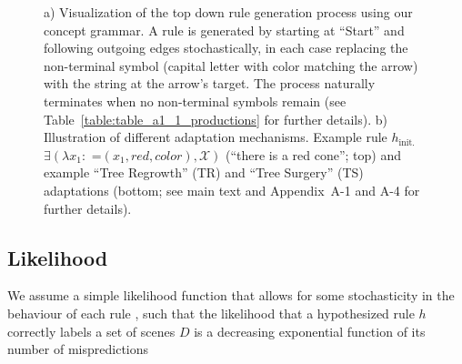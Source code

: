 \documentclass[doc,natbib,floatsintext]{apa7}
\newcommand{\xx}{\mathcal{X}} %
\newcommand{\hi}{h_{\mathrm{init.}}}
\begin{document}
\begin{figure}[!th]
    \begin{center}
    \end{center}

    \caption{a) Visualization of the top down rule generation process using our concept grammar. A rule is generated by starting at ``Start'' and following outgoing edges stochastically, in each case replacing the non-terminal symbol (capital letter with color matching the arrow) with the string at the arrow's target. The process naturally terminates when no non-terminal symbols remain (see Table~\ref{table:table_a1_1_productions} for further details). b) Illustration of different adaptation mechanisms. Example rule $\hi$ $\exists(\lambda x_{1}\!:\! \text{ =}(x_1, red, color),\xx)$ (``there is a red cone''; top) and example ``Tree Regrowth'' (TR) and ``Tree Surgery'' (TS) adaptations (bottom; see main text and Appendix~A-1 and A-4 for further details). 
    }
    \label{fig:fig_3_adaptation}
\end{figure}

\subsection{Likelihood}
We assume a simple likelihood function that allows for some stochasticity in the behaviour of each rule \citep[cf.][]{goodman2008rational,lewis2014error}, such that the likelihood that a hypothesized rule $h$ correctly labels a set of scenes $D$ is a decreasing exponential function of its number of mispredictions
\end{document}
